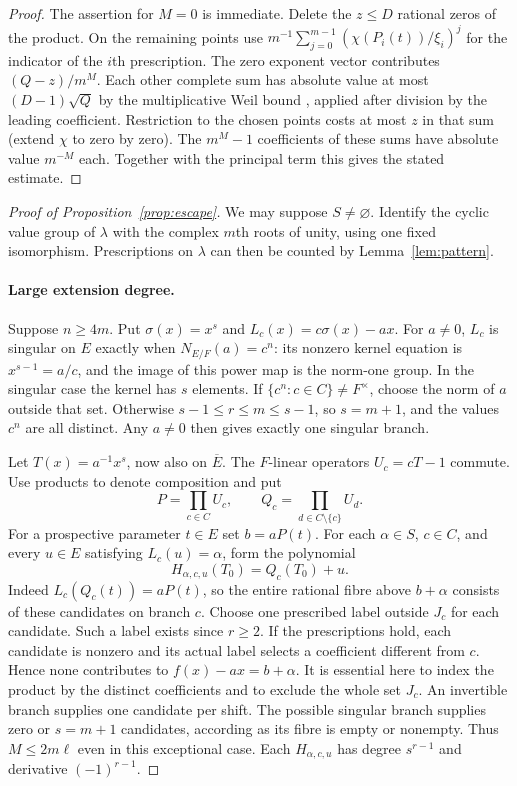 \documentclass[preprint,12pt,numbers]{elsarticle}
\begin{document}
\begin{proof}
The assertion for $M=0$ is immediate. Delete the $z\le D$ rational zeros
of the product. On the remaining points use
$m^{-1}\sum_{j=0}^{m-1}(\chi(P_i(t))/\xi_i)^j$ for the indicator of
the $i$th prescription. The zero exponent vector contributes
$(Q-z)/m^M$. Each other complete sum has absolute value at most
$(D-1)\sqrt Q$ by the multiplicative Weil bound
\cite[Theorem~5.41]{LN}, applied after division by the leading
coefficient. Restriction to the chosen points costs at most $z$ in that
sum (extend $\chi$ to zero by zero). The $m^M-1$ coefficients of these
sums have absolute value $m^{-M}$ each. Together with the principal
term this gives the stated estimate.
\end{proof}

\begin{proof}[Proof of Proposition~\ref{prop:escape}]
We may suppose $S\ne\varnothing$. Identify the cyclic value group of
$\lambda$ with the complex $m$th roots of unity, using one fixed
isomorphism. Prescriptions on $\lambda$ can then be counted by
Lemma~\ref{lem:pattern}.

\paragraph{Large extension degree.}
Suppose $n\ge4m$. Put $\sigma(x)=x^s$ and $L_c(x)=c\sigma(x)-ax$.
For $a\ne0$, $L_c$ is singular on $E$ exactly when
$N_{E/F}(a)=c^n$: its nonzero kernel equation is
$x^{s-1}=a/c$, and the image of this power map is the norm-one group.
In the singular case the kernel has $s$ elements. If
$\{c^n:c\in C\}\ne F^\times$, choose the norm of $a$ outside that set.
Otherwise $s-1\le r\le m\le s-1$, so $s=m+1$, and the values $c^n$
are all distinct. Any $a\ne0$ then gives exactly one singular branch.

Let $T(x)=a^{-1}x^s$, now also on $\overline E$. The $F$-linear
operators $U_c=cT-1$ commute. Use products to denote composition and put
\[
 P=\prod_{c\in C}U_c,\qquad Q_c=\prod_{d\in C\setminus\{c\}}U_d .
\]
For a prospective parameter $t\in E$ set $b=aP(t)$. For each
$\alpha\in S$, $c\in C$, and every $u\in E$ satisfying $L_c(u)=\alpha$,
form the polynomial
\[
                 H_{\alpha,c,u}(T_0)=Q_c(T_0)+u .
\]
Indeed $L_c(Q_c(t))=aP(t)$, so the entire rational fibre above
$b+\alpha$ consists of these candidates on branch $c$.
Choose one prescribed label outside $J_c$ for each candidate. Such a
label exists since $r\ge2$. If the prescriptions hold, each candidate
is nonzero and its actual label selects a coefficient different from
$c$. Hence none contributes to $f(x)-ax=b+\alpha$. It is essential here
to index the product by the distinct coefficients and to exclude the
whole set $J_c$. An invertible branch supplies one candidate per shift.
The possible singular branch supplies zero or $s=m+1$ candidates,
according as its fibre is empty or nonempty. Thus $M\le2m\ell$ even in
this exceptional case. Each $H_{\alpha,c,u}$ has degree $s^{r-1}$ and
derivative $(-1)^{r-1}$.


\end{proof}
\end{document}
